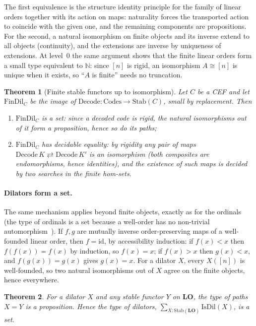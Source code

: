 \documentclass[11pt]{article}
\newtheorem{theorem}{Theorem}[section]
\theoremstyle{definition}
\theoremstyle{remark}
\newcommand{\Stab}{\mathrm{Stab}}
\newcommand{\LO}{\mathbf{LO}}
\begin{document}
The first equivalence is the structure identity principle for the family
of linear orders together with its action on maps: naturality forces the
transported action to coincide with the given one, and the remaining
components are propositions. For the second, a natural isomorphism on
finite objects and its inverse extend to all objects (continuity), and the
extensions are inverse by uniqueness of extensions. At level~$0$ the same
argument shows that the finite linear orders form a small type equivalent
to $\mathbb{N}$: since $[n]$ is rigid, an isomorphism $A\cong[n]$ is unique
when it exists, so ``$A$ is finite'' needs no truncation.

\begin{theorem}[Finite stable functors up to isomorphism]
Let $C$ be a CEF and let $\mathrm{FinDil}_C$ be the image of
$\mathrm{Decode}:\mathrm{Codes}\to\Stab(C)$, small by replacement. Then
\begin{enumerate}
\item $\mathrm{FinDil}_C$ is a set: since a decoded code is rigid, the
  natural isomorphisms out of it form a proposition, hence so do its
  paths;
\item $\mathrm{FinDil}_C$ has decidable equality: by rigidity \emph{any}
  pair of maps $\mathrm{Decode}\,K\rightleftarrows\mathrm{Decode}\,K'$ is
  an isomorphism (both composites are endomorphisms, hence identities),
  and the existence of such maps is decided by two searches in the finite
  hom-sets.
\end{enumerate}
\end{theorem}

\paragraph{Dilators form a set.} The same mechanism applies beyond finite
objects, exactly as for the ordinals (the type of ordinals is a set because
a well-order has no non-trivial automorphism~\cite[\S10.3]{HoTT}). If $f,g$
are mutually inverse order-preserving maps of a well-founded linear order,
then $f=\mathrm{id}$, by accessibility induction: if $f(x)<x$ then
$f(f(x))=f(x)$ by induction, so $f(x)=x$; if $f(x)>x$ then $g(x)<x$, and
$f(g(x))=g(x)$ gives $g(x)=x$. For a dilator $X$, every $X([n])$ is
well-founded, so two natural isomorphisms out of $X$ agree on the finite
objects, hence everywhere.

\begin{theorem}
For a dilator $X$ and any stable functor $Y$ on $\LO$, the type of paths
$X=Y$ is a proposition. Hence the type of dilators,
$\sum_{X:\Stab(\LO)}\mathrm{IsDil}(X)$, is a set.
\end{theorem}
\end{document}
